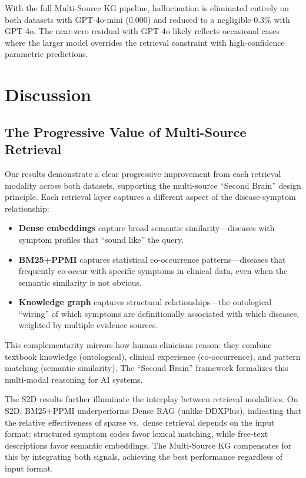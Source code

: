 \documentclass[review]{elsarticle}
\begin{document}
With the full Multi-Source KG pipeline, hallucination is eliminated entirely on both datasets with GPT-4o-mini (0.000) and reduced to a negligible 0.3\% with GPT-4o. The near-zero residual with GPT-4o likely reflects occasional cases where the larger model overrides the retrieval constraint with high-confidence parametric predictions.

\section{Discussion}
\label{sec:discussion}

\subsection{The Progressive Value of Multi-Source Retrieval}

Our results demonstrate a clear progressive improvement from each retrieval modality across both datasets, supporting the multi-source ``Second Brain'' design principle. Each retrieval layer captures a different aspect of the disease-symptom relationship:

\begin{itemize}
    \item \textbf{Dense embeddings} capture broad semantic similarity---diseases with symptom profiles that ``sound like'' the query.
    \item \textbf{BM25+PPMI} captures statistical co-occurrence patterns---diseases that frequently co-occur with specific symptoms in clinical data, even when the semantic similarity is not obvious.
    \item \textbf{Knowledge graph} captures structural relationships---the ontological ``wiring'' of which symptoms are definitionally associated with which diseases, weighted by multiple evidence sources.
\end{itemize}

This complementarity mirrors how human clinicians reason: they combine textbook knowledge (ontological), clinical experience (co-occurrence), and pattern matching (semantic similarity). The ``Second Brain'' framework formalizes this multi-modal reasoning for AI systems.

The S2D results further illuminate the interplay between retrieval modalities. On S2D, BM25+PPMI underperforms Dense RAG (unlike DDXPlus), indicating that the relative effectiveness of sparse vs.\ dense retrieval depends on the input format: structured symptom codes favor lexical matching, while free-text descriptions favor semantic embeddings. The Multi-Source KG compensates for this by integrating both signals, achieving the best performance regardless of input format.
\end{document}
